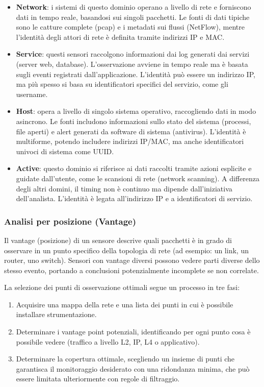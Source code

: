 \begin{itemize}
\item \textbf{Network}: i sistemi di questo dominio operano a livello di rete
e forniscono dati in tempo reale, basandosi sui singoli pacchetti.
Le fonti di dati tipiche sono le catture complete (pcap) e i metadati
sui flussi (NetFlow), mentre l'identità degli attori di rete è definita
tramite indirizzi IP e MAC.
\item \textbf{Service}: questi sensori raccolgono informazioni dai log
generati dai servizi (server web, database). L'osservazione avviene
in tempo reale ma è basata sugli eventi registrati dall'applicazione.
L'identità può essere un indirizzo IP, ma più spesso si basa su
identificatori specifici del servizio, come gli username.
\item \textbf{Host}: opera a livello di singolo sistema operativo,
raccogliendo dati in modo asincrono. Le fonti includono informazioni
sullo stato del sistema (processi, file aperti) e alert generati
da software di sistema (antivirus). L'identità è multiforme, potendo
includere indirizzi IP/MAC, ma anche identificatori univoci di sistema
come UUID.
\item \textbf{Active}: questo dominio si riferisce ai dati raccolti
tramite azioni esplicite e guidate dall'utente, come le scansioni di
rete (network scanning). A differenza degli altri domini, il timing
non è continuo ma dipende dall'iniziativa dell'analista. L'identità
è legata all'indirizzo IP e a identificatori di servizio.
\end{itemize}

\subsubsection{Analisi per posizione (Vantage)}

Il vantage (posizione) di un sensore descrive quali pacchetti è in grado
di osservare in un punto specifico della topologia di rete
(ad esempio: un link, un router, uno switch).
Sensori con vantage diversi possono vedere parti diverse dello stesso
evento, portando a conclusioni potenzialmente incomplete se non correlate.

La selezione dei punti di osservazione ottimali segue un processo in tre fasi:

\begin{enumerate}
\item Acquisire una mappa della rete e una lista dei punti in cui
è possibile installare strumentazione.
\item Determinare i vantage point potenziali, identificando per ogni
punto cosa è possibile vedere (traffico a livello L2, IP, L4
o applicativo).
\item Determinare la copertura ottimale, scegliendo un insieme di punti
che garantisca il monitoraggio desiderato con una ridondanza minima, che può essere 
limitata ulteriormente con regole di filtraggio.
\end{enumerate}


